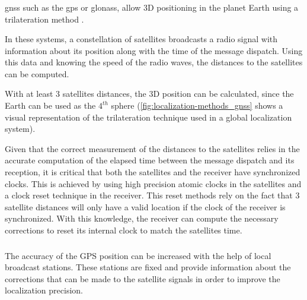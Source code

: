 \subsubsection{}

\gls{gnss} such as the \gls{gps} or \gls{glonass}, allow 3D positioning in the planet Earth  using a trilateration method \cite{Knedlik2007}.

In these systems, a constellation of satellites broadcasts a radio signal with information about its position along with the time of the message dispatch. Using this data and knowing the speed of the radio waves, the distances to the satellites can be computed.

With at least 3 satellites distances, the 3D position can be calculated, since the Earth can be used as the ${4}^{th}$ sphere (\cref{fig:localization-methods_gnss} shows a visual representation of the trilateration technique used in a global localization system).

Given that the correct measurement of the distances to the satellites relies in the accurate computation of the elapsed time between the message dispatch and its reception, it is critical that both the satellites and the receiver have synchronized clocks. This is achieved by using high precision atomic clocks in the satellites and a clock reset technique in the receiver. This reset methods rely on the fact that 3 satellite distances will only have a valid location if the clock of the receiver is synchronized. With this knowledge, the receiver can compute the necessary corrections to reset its internal clock to match the satellites time.



\subsubsection{}

The accuracy of the GPS position can be increased with the help of local broadcast stations. These stations are fixed and provide information about the corrections that can be made to the satellite signals in order to improve the localization precision.

